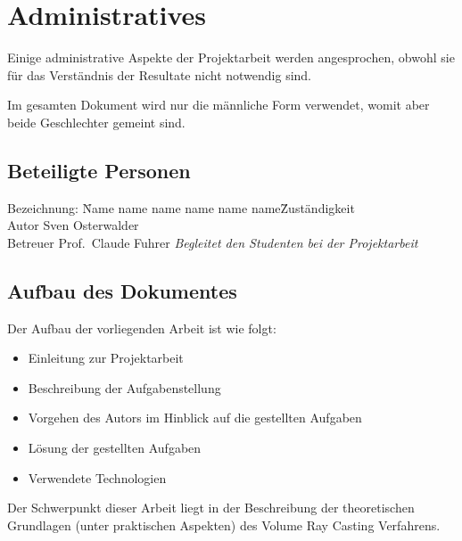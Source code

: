 
\chapter{Administratives}
\label{chap:20_administrative}

Einige administrative Aspekte der Projektarbeit werden angesprochen,
obwohl sie für das Verständnis der Resultate nicht notwendig sind.

Im gesamten Dokument wird nur die männliche Form verwendet, womit aber
beide Geschlechter gemeint sind.

\section{Beteiligte Personen}
\label{sec:involved_persons}

\begin{tabbing} %
Bezeichnung: \= Name name name name name name\= Zuständigkeit \kill \\
    Autor           \> Sven Osterwalder\protect\footnotemark[1]{}    \> \\
    Betreuer        \> Prof.\ Claude Fuhrer\protect\footnotemark[2]{}  \> \textit{Begleitet den Studenten bei der Projektarbeit}\\
\end{tabbing}

\section{Aufbau des Dokumentes}
\label{sec:document_structure}

Der Aufbau der vorliegenden Arbeit ist wie folgt:
\begin{itemize}
    \item Einleitung zur Projektarbeit
    \item Beschreibung der Aufgabenstellung
    \item Vorgehen des Autors im Hinblick auf die gestellten Aufgaben
    \item Lösung der gestellten Aufgaben
    \item Verwendete Technologien
\end{itemize}

Der Schwerpunkt dieser Arbeit liegt in der Beschreibung der
theoretischen Grundlagen (unter praktischen Aspekten) des Volume Ray
Casting Verfahrens.

